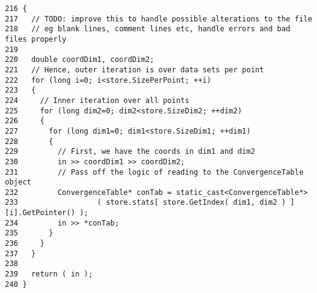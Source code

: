 \begin{Code}\begin{verbatim}216 {
217   // TODO: improve this to handle possible alterations to the file
218   // eg blank lines, comment lines etc, handle errors and bad files properly
219 
220   double coordDim1, coordDim2;
221   // Hence, outer iteration is over data sets per point
222   for (long i=0; i<store.SizePerPoint; ++i)
223   {
224     // Inner iteration over all points
225     for (long dim2=0; dim2<store.SizeDim2; ++dim2)
226     {
227       for (long dim1=0; dim1<store.SizeDim1; ++dim1)
228       {
229         // First, we have the coords in dim1 and dim2
230         in >> coordDim1 >> coordDim2;
231         // Pass off the logic of reading to the ConvergenceTable object
232         ConvergenceTable* conTab = static_cast<ConvergenceTable*>
233                  ( store.stats[ store.GetIndex( dim1, dim2 ) ][i].GetPointer() );
234         in >> *conTab;
235       }
236     }
237   }
238 
239   return ( in );
240 }
\end{verbatim}
\end{Code}


